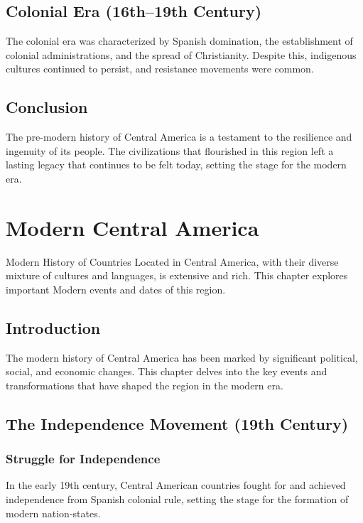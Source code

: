 \documentclass[a4paper,12pt]{book}
\begin{document}
\section{Colonial Era (16th–19th Century)}
\label{sec:colonial-era}
The colonial era was characterized by Spanish domination, the establishment of colonial administrations, and the spread of Christianity. Despite this, indigenous cultures continued to persist, and resistance movements were common.

\section{Conclusion}
\label{sec:conclusion-pre-modern-central-america}
The pre-modern history of Central America is a testament to the resilience and ingenuity of its people. The civilizations that flourished in this region left a lasting legacy that continues to be felt today, setting the stage for the modern era.

\chapter{Modern Central America}
\label{ch:modern-history-central-america}

Modern History of Countries Located in Central America, with their diverse mixture of cultures and languages, is extensive and rich. This chapter explores important Modern events and dates of this region.

\section{Introduction}
\label{sec:introduction-modern-central-america}
The modern history of Central America has been marked by significant political, social, and economic changes. This chapter delves into the key events and transformations that have shaped the region in the modern era.

\section{The Independence Movement (19th Century)}
\label{sec:independence-movement}
\subsection{Struggle for Independence}
\label{subsec:struggle-independence}
In the early 19th century, Central American countries fought for and achieved independence from Spanish colonial rule, setting the stage for the formation of modern nation-states.
\end{document}
